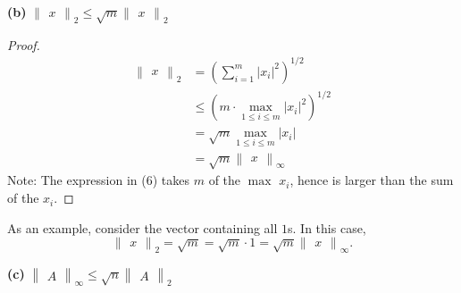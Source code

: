 \documentclass{article}
\begin{document}
    \textbf{(b)} $\begin{Vmatrix}
        x
    \end{Vmatrix}_2 \leq \sqrt{m}\begin{Vmatrix}
        x
    \end{Vmatrix}_2$
    \begin{proof}
        \begin{align}
            \begin{Vmatrix}
                x
            \end{Vmatrix}_2
            &= \left( \sum_{i = 1}^m \lvert x_i \rvert^2 \right)^{1/2}\\
            &\leq \left( m \cdot \max_{1 \leq i \leq m} \lvert x_i \rvert^2  \right)^{1/2}\\
            &= \sqrt{m}\max_{1 \leq i \leq m} \lvert x_i \rvert\\
            &= \sqrt{m}\begin{Vmatrix}
                x
            \end{Vmatrix}_\infty
        \end{align}
        Note: The expression in (6) takes $m$ of the $\max$ $x_i$, hence is larger than the sum of the $x_i$.
    \end{proof}

    As an example, consider the vector containing all $1$s. In this case, \[ \begin{Vmatrix}
        x
    \end{Vmatrix}_2 = \sqrt{m} = \sqrt{m} \cdot 1 = \sqrt{m}\begin{Vmatrix}
        x
    \end{Vmatrix}_\infty.\]

\textbf{(c)} 
$
\begin{Vmatrix}
    A
\end{Vmatrix}_\infty 
\leq 
\sqrt{n} 
\begin{Vmatrix}
    A
\end{Vmatrix}_2
$
\end{document}
